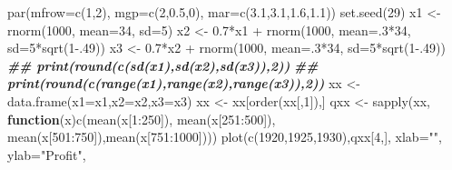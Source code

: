 \documentclass[
  10pt,
  b5paper]{book}
\newenvironment{Shaded}{\begin{snugshade}}{\end{snugshade}}
\newcommand{\AttributeTok}[1]{\textcolor[rgb]{0.77,0.63,0.00}{#1}}
\newcommand{\ControlFlowTok}[1]{\textcolor[rgb]{0.13,0.29,0.53}{\textbf{#1}}}
\newcommand{\DecValTok}[1]{\textcolor[rgb]{0.00,0.00,0.81}{#1}}
\newcommand{\DocumentationTok}[1]{\textcolor[rgb]{0.56,0.35,0.01}{\textbf{\textit{#1}}}}
\newcommand{\FloatTok}[1]{\textcolor[rgb]{0.00,0.00,0.81}{#1}}
\newcommand{\FunctionTok}[1]{\textcolor[rgb]{0.00,0.00,0.00}{#1}}
\newcommand{\NormalTok}[1]{#1}
\newcommand{\OtherTok}[1]{\textcolor[rgb]{0.56,0.35,0.01}{#1}}
\newcommand{\SpecialCharTok}[1]{\textcolor[rgb]{0.00,0.00,0.00}{#1}}
\newcommand{\StringTok}[1]{\textcolor[rgb]{0.31,0.60,0.02}{#1}}
\begin{document}
\begin{Shaded}
\begin{Highlighting}[]
\FunctionTok{par}\NormalTok{(}\AttributeTok{mfrow=}\FunctionTok{c}\NormalTok{(}\DecValTok{1}\NormalTok{,}\DecValTok{2}\NormalTok{), }\AttributeTok{mgp=}\FunctionTok{c}\NormalTok{(}\DecValTok{2}\NormalTok{,}\FloatTok{0.5}\NormalTok{,}\DecValTok{0}\NormalTok{), }\AttributeTok{mar=}\FunctionTok{c}\NormalTok{(}\FloatTok{3.1}\NormalTok{,}\FloatTok{3.1}\NormalTok{,}\FloatTok{1.6}\NormalTok{,}\FloatTok{1.1}\NormalTok{))}
\FunctionTok{set.seed}\NormalTok{(}\DecValTok{29}\NormalTok{)}
\NormalTok{x1 }\OtherTok{\textless{}{-}} \FunctionTok{rnorm}\NormalTok{(}\DecValTok{1000}\NormalTok{, }\AttributeTok{mean=}\DecValTok{34}\NormalTok{, }\AttributeTok{sd=}\DecValTok{5}\NormalTok{)}
\NormalTok{x2 }\OtherTok{\textless{}{-}} \FloatTok{0.7}\SpecialCharTok{*}\NormalTok{x1 }\SpecialCharTok{+} \FunctionTok{rnorm}\NormalTok{(}\DecValTok{1000}\NormalTok{, }\AttributeTok{mean=}\NormalTok{.}\DecValTok{3}\SpecialCharTok{*}\DecValTok{34}\NormalTok{, }\AttributeTok{sd=}\DecValTok{5}\SpecialCharTok{*}\FunctionTok{sqrt}\NormalTok{(}\DecValTok{1}\FloatTok{{-}.49}\NormalTok{))}
\NormalTok{x3 }\OtherTok{\textless{}{-}} \FloatTok{0.7}\SpecialCharTok{*}\NormalTok{x2 }\SpecialCharTok{+} \FunctionTok{rnorm}\NormalTok{(}\DecValTok{1000}\NormalTok{, }\AttributeTok{mean=}\NormalTok{.}\DecValTok{3}\SpecialCharTok{*}\DecValTok{34}\NormalTok{, }\AttributeTok{sd=}\DecValTok{5}\SpecialCharTok{*}\FunctionTok{sqrt}\NormalTok{(}\DecValTok{1}\FloatTok{{-}.49}\NormalTok{))}
\DocumentationTok{\#\# print(round(c(sd(x1),sd(x2),sd(x3)),2))}
\DocumentationTok{\#\# print(round(c(range(x1),range(x2),range(x3)),2))}
\NormalTok{xx }\OtherTok{\textless{}{-}} \FunctionTok{data.frame}\NormalTok{(}\AttributeTok{x1=}\NormalTok{x1,}\AttributeTok{x2=}\NormalTok{x2,}\AttributeTok{x3=}\NormalTok{x3)}
\NormalTok{xx }\OtherTok{\textless{}{-}}\NormalTok{ xx[}\FunctionTok{order}\NormalTok{(xx[,}\DecValTok{1}\NormalTok{]),]}
\NormalTok{qxx }\OtherTok{\textless{}{-}} \FunctionTok{sapply}\NormalTok{(xx, }\ControlFlowTok{function}\NormalTok{(x)}\FunctionTok{c}\NormalTok{(}\FunctionTok{mean}\NormalTok{(x[}\DecValTok{1}\SpecialCharTok{:}\DecValTok{250}\NormalTok{]), }\FunctionTok{mean}\NormalTok{(x[}\DecValTok{251}\SpecialCharTok{:}\DecValTok{500}\NormalTok{]),}
 \FunctionTok{mean}\NormalTok{(x[}\DecValTok{501}\SpecialCharTok{:}\DecValTok{750}\NormalTok{]),}\FunctionTok{mean}\NormalTok{(x[}\DecValTok{751}\SpecialCharTok{:}\DecValTok{1000}\NormalTok{])))}
\FunctionTok{plot}\NormalTok{(}\FunctionTok{c}\NormalTok{(}\DecValTok{1920}\NormalTok{,}\DecValTok{1925}\NormalTok{,}\DecValTok{1930}\NormalTok{),qxx[}\DecValTok{4}\NormalTok{,], }\AttributeTok{xlab=}\StringTok{""}\NormalTok{, }\AttributeTok{ylab=}\StringTok{"Profit"}\NormalTok{, }

\end{Highlighting}
\end{Shaded}
\end{document}
